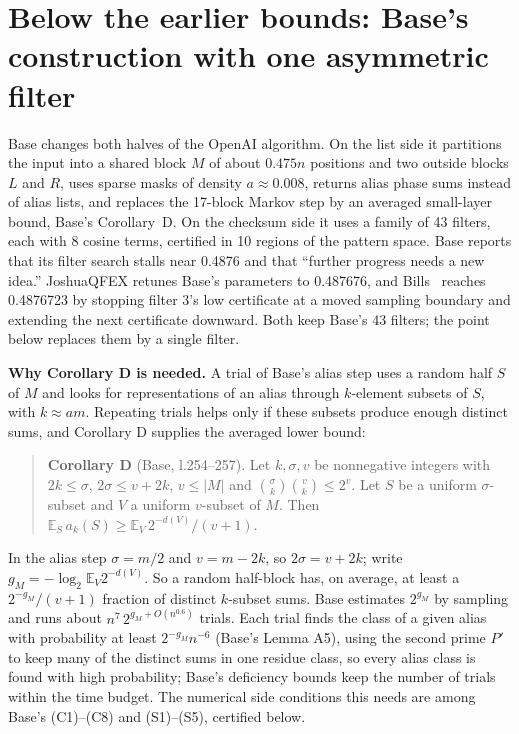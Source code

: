 \documentclass[11pt]{article}
\newcommand{\E}{\mathbb{E}}
\theoremstyle{plain}
\begin{document}
\section{Below the earlier bounds: Base's construction with one asymmetric filter}

Base changes both halves of the OpenAI algorithm. On the list side it partitions the input into a shared block $M$ of about $0.475n$ positions and two outside blocks $L$ and $R$, uses sparse masks of density $a \approx 0.008$, returns alias phase sums instead of alias lists, and replaces the 17-block Markov step by an averaged small-layer bound, Base's Corollary~D. On the checksum side it uses a family of 43 filters, each with 8 cosine terms, certified in 10 regions of the pattern space. Base reports that its filter search stalls near 0.4876 and that ``further progress needs a new idea.'' JoshuaQFEX retunes Base's parameters to 0.487676, and Bills~\cite{bills} reaches 0.4876723 by stopping filter 3's low certificate at a moved sampling boundary and extending the next certificate downward. Both keep Base's 43 filters; the point below replaces them by a single filter.

\textbf{Why Corollary D is needed.} A trial of Base's alias step uses a random half $S$ of $M$ and looks for representations of an alias through $k$-element subsets of $S$, with $k \approx am$. Repeating trials helps only if these subsets produce enough distinct sums, and Corollary D supplies the averaged lower bound:

\begin{quote}
\textbf{Corollary D} (Base, l.254--257). Let $k, \sigma, v$ be nonnegative integers with $2k \le \sigma$, $2\sigma \le v + 2k$, $v \le |M|$ and $\binom{\sigma}{k}\binom{v}{k} \le 2^v$. Let $S$ be a uniform $\sigma$-subset and $V$ a uniform $v$-subset of $M$. Then $\E_S\, a_k(S) \ge \E_V\, 2^{-d(V)}/(v+1)$.
\end{quote}

In the alias step $\sigma = m/2$ and $v = m - 2k$, so $2\sigma = v + 2k$; write $g_M = -\log_2 \E_V 2^{-d(V)}$. So a random half-block has, on average, at least a $2^{-g_M}/(v+1)$ fraction of distinct $k$-subset sums. Base estimates $2^{g_M}$ by sampling and runs about $n^7\, 2^{g_M + O(n^{0.6})}$ trials. Each trial finds the class of a given alias with probability at least $2^{-g_M} n^{-6}$ (Base's Lemma A5), using the second prime $P'$ to keep many of the distinct sums in one residue class, so every alias class is found with high probability; Base's deficiency bounds keep the number of trials within the time budget. The numerical side conditions this needs are among Base's (C1)--(C8) and (S1)--(S5), certified below.
\end{document}
